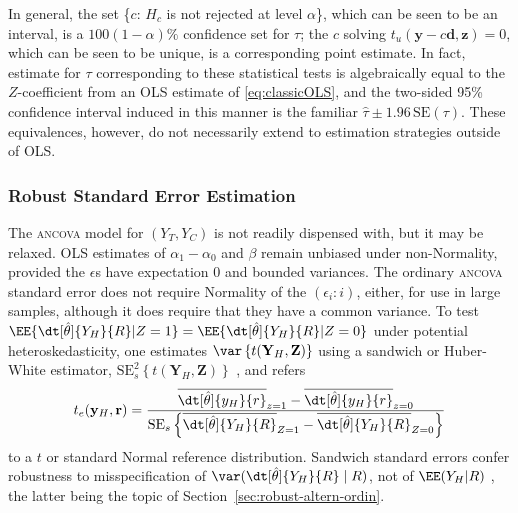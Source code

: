 In general, the set \{$c$:
$H_{c}$ is not rejected at level $\alpha$\}, which can be seen to be an interval, is a
$100(1-\alpha)\%$ confidence set for $\tau$; the $c$ solving
$t_{u}(\mathbf{y}-c\mathbf{d}, \mathbf{z}) = 0$, which can be seen to be unique, is a
corresponding point estimate.
In fact, estimate for $\tau$ corresponding to these statistical tests is
algebraically equal to the $Z$-coefficient from an OLS estimate of
\eqref{eq:classicOLS}, and the two-sided 95\% confidence interval induced in this
manner is the familiar
$\hat{\tau} \pm 1.96\, \mathrm{SE}(\tau)$.
These equivalences, however, do not necessarily extend to estimation
strategies outside of OLS.

\subsubsection{Robust Standard Error Estimation}
The \textsc{ancova} model for $(Y_{T}, Y_{C})$ is not readily dispensed with, but it
may be relaxed.  OLS estimates of $\alpha_1-\alpha_{0}$ and
$\beta$ remain unbiased under non-Normality, provided
the $\epsilon$s have expectation 0 and bounded variances.  The
ordinary \textsc{ancova} standard error does not require Normality of
the $( \epsilon_{i}: i )$, either, for use in large samples, although
it does require that they have a common variance.
To test
$\EE\{ \dt[\hat\theta]{{Y_H}}{ R} | Z=1\} = \EE\{ \dt[\hat\theta]{{Y_H}}{
R} | Z=0\}$
under potential heteroskedasticity, one estimates
$\var\left\{t(\mathbf{Y}_H , \mathbf{Z})\right\}$
using a sandwich or Huber-White estimator,
$\mathrm{SE}_{s}^{2} \left\{ t(\mathbf{Y}_H , \mathbf{Z}) \right\}$
\citep{huber1967behavior,mackinnonWhite1985sandwichHC,longErvin2000sandwichHC,
bellmccaffrey2002sandwichSEs,pustejovskyTipton2017sandwichSEs}, %
and refers
\begin{equation} \label{eq:tedef}
t_{e} (\mathbf{y}_H,\mathbf{r}) =
\frac{\overline{\dt[\hat\theta]{{y_H}}{ r}}_{z=1} -
                             \overline{\dt[\hat\theta]{{y_H}}{ r}}_{z=0}}%
                           {\mathrm{SE}_{s}\left\{ \overline{\dt[\hat\theta]{{Y_H}}{ R}}_{Z=1} -
                             \overline{\dt[\hat\theta]{{Y_H}}{ R}}_{Z=0}
                           \right\} }
\end{equation}
to a $t$ or standard Normal reference distribution.
Sandwich standard errors confer robustness to misspecification of
$\var(\dt[\hat\theta]{Y_{H}}{R}\mid  R)$, not of $\EE(Y_{H}| R)$ \citep{freedman2006sch}, the latter being the topic of
Section~\ref{sec:robust-altern-ordin}.

